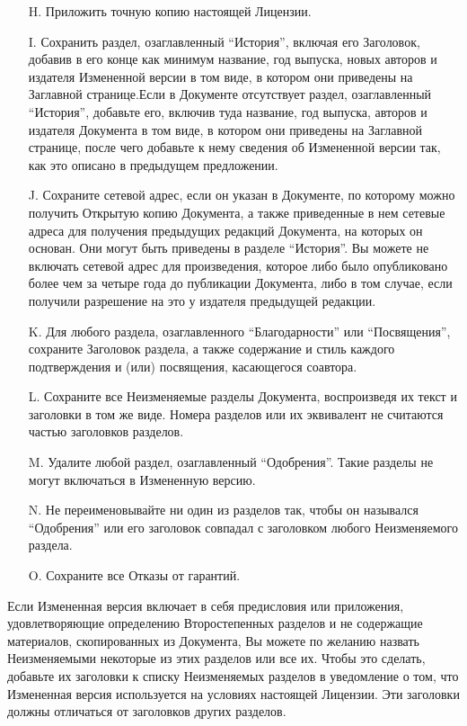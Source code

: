\begin{itemize}
\item[H.]
Приложить точную копию настоящей Лицензии.

\item[I.]
Сохранить раздел, озаглавленный \enquote{История}, включая его
Заголовок, добавив в его конце как минимум название, год выпуска,
новых авторов и издателя Измененной версии в том виде, в котором они
приведены на Заглавной странице.Если в Документе отсутствует раздел,
озаглавленный \enquote{История}, добавьте его, включив туда название,
год выпуска, авторов и издателя Документа в том виде, в котором они
приведены на Заглавной странице, после чего добавьте к нему сведения
об Измененной версии так, как это описано в предыдущем предложении.

\item[J.]
Сохраните сетевой адрес, если он указан в Документе, по которому можно
получить Открытую копию Документа, а также приведенные в нем сетевые
адреса для получения предыдущих редакций Документа, на которых он
основан. Они могут быть приведены в разделе \enquote{История}. Вы
можете не включать сетевой адрес для произведения, которое либо было
опубликовано более чем за четыре года до публикации Документа, либо в
том случае, если получили разрешение на это у издателя предыдущей
редакции.

\item[K.]
Для любого раздела, озаглавленного \enquote{Благодарности} или
\enquote{Посвящения}, сохраните Заголовок раздела, а также содержание
и стиль каждого подтверждения и (или) посвящения, касающегося
соавтора.

\item[L.]
Сохраните все Неизменяемые разделы Документа, воспроизведя их текст и
заголовки в том же виде. Номера разделов или их эквивалент не
считаются частью заголовков разделов.

\item[M.]
Удалите любой раздел, озаглавленный \enquote{Одобрения}. Такие разделы
не могут включаться в Измененную версию.

\item[N.]
Не переименовывайте ни один из разделов так, чтобы он назывался
\enquote{Одобрения} или его заголовок совпадал с заголовком любого
Неизменяемого раздела.

\item[O.]
Сохраните все Отказы от гарантий.
\end{itemize}

Если Измененная версия включает в себя предисловия или приложения,
удовлетворяющие определению Второстепенных разделов и не содержащие
материалов, скопированных из Документа, Вы можете по желанию назвать
Неизменяемыми некоторые из этих разделов или все их. Чтобы это
сделать, добавьте их заголовки к списку Неизменяемых разделов в
уведомление о том, что Измененная версия используется на условиях
настоящей Лицензии. Эти заголовки должны отличаться от заголовков
других разделов.

